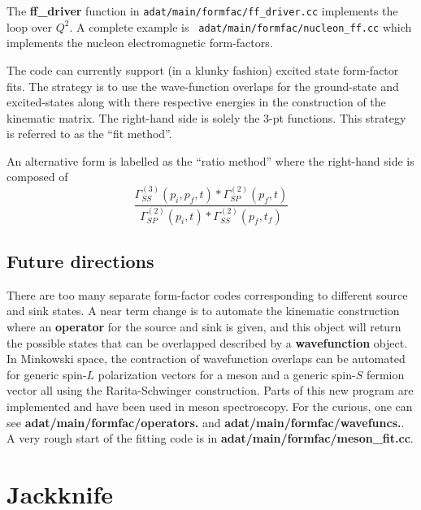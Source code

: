\documentclass[11pt]{article}
\begin{document}
The {\bf ff\_driver} function in {\tt adat/main/formfac/ff\_driver.cc}
implements the loop over $Q^2$. A complete example is {\tt
adat/main/formfac/nucleon\_ff.cc} which implements the nucleon
electromagnetic form-factors.

The code can currently support (in a klunky fashion) excited state
form-factor fits. The strategy is to use the wave-function overlaps
for the ground-state and excited-states along with there respective
energies in the construction of the kinematic matrix. The right-hand
side is solely the 3-pt functions.  This strategy is referred to as
the ``fit method''.

An alternative form is labelled as the ``ratio method'' where the
right-hand side is composed of 
\begin{equation}
\frac{\Gamma^{(3)}_{SS}(p_i,p_f,t)*\Gamma^{(2)}_{SP}(p_f,t)}{\Gamma^{(2)}_{SP}(p_i,t)*\Gamma^{(2)}_{SS}(p_f,t_f)}
\end{equation}

\subsection{Future directions}
There are too many separate form-factor codes corresponding to different source
and sink states. A near term change is to automate the kinematic construction
where an {\bf operator} for the source and sink is given, and this object
will return the possible states that can be overlapped described by a {\bf wavefunction}
object. In Minkowski space, the contraction of wavefunction overlaps can be automated
for generic spin-$L$ polarization vectors for a meson and a generic spin-$S$ fermion vector
all using the Rarita-Schwinger construction. Parts of this new program are implemented
and have been used in meson spectroscopy. For the curious, one can see
{\bf adat/main/formfac/operators.\*} and {\bf adat/main/formfac/wavefuncs.\*}.
A very rough start of the fitting code is in {\bf adat/main/formfac/meson\_fit.cc}.


\appendix

\section{Jackknife}\label{sec:jackknife}
\end{document}
